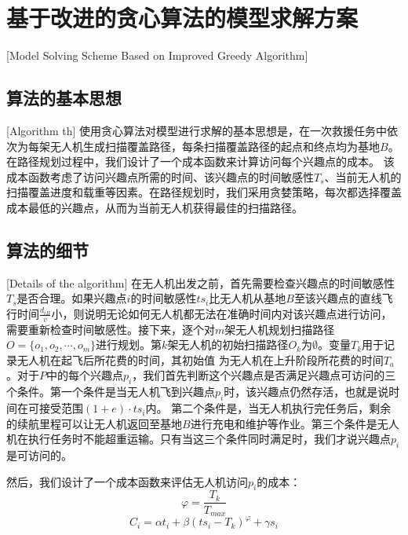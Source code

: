 
\chapter{基于改进的贪心算法的模型求解方案}[Model Solving Scheme Based on Improved Greedy Algorithm]

\section{算法的基本思想}[Algorithm th]
使用贪心算法对模型进行求解的基本思想是，在一次救援任务中依次为每架无人机生成扫描覆盖路径，每条扫描覆盖路径的起点和终点均为基地$B$。在路径规划过程中，我们设计了一个成本函数来计算访问每个兴趣点的成本。
该成本函数考虑了访问兴趣点所需的时间、该兴趣点的时间敏感性$T_s$、当前无人机的扫描覆盖进度和载重等因素。在路径规划时，我们采用贪婪策略，每次都选择覆盖成本最低的兴趣点，从而为当前无人机获得最佳的扫描路径。

\section{算法的细节}[Details of the algorithm]
在无人机出发之前，首先需要检查兴趣点的时间敏感性$T_s$是否合理。如果兴趣点$i$的时间敏感性$ts_i$比无人机从基地$B$至该兴趣点的直线飞行时间$\frac{d_{iB}}{v}$小，则说明无论如何无人机都无法在准确时间内对该兴趣点进行访问，
需要重新检查时间敏感性。接下来，逐个对$m$架无人机规划扫描路径$O=\lbrace o_1, o_2, \cdots ,o_m \rbrace$进行规划。第$k$架无人机的初始扫描路径$O_k$为$\emptyset$。变量$T_k$用于记录无人机在起飞后所花费的时间，其初始值
为无人机在上升阶段所花费的时间$T_a$。对于$P$中的每个兴趣点$p_i$，我们首先判断这个兴趣点是否满足兴趣点可访问的三个条件。第一个条件是当无人机飞到兴趣点$p_i$时，该兴趣点仍然存活，也就是说时间在可接受范围$(1+e) \cdot ts_i$内。
第二个条件是，当无人机执行完任务后，剩余的续航里程可以让无人机返回至基地$B$进行充电和维护等作业。第三个条件是无人机在执行任务时不能超重运输。只有当这三个条件同时满足时，我们才说兴趣点$p_i$是可访问的。


然后，我们设计了一个成本函数来评估无人机访问$p_i$的成本：
\begin{equation}
	\varphi = \frac{T_k}{T_{max}}
\end{equation}
\begin{equation}
	C_i = \alpha t_i + \beta (ts_i - T_k)^\varphi + \gamma s_i
\end{equation}


